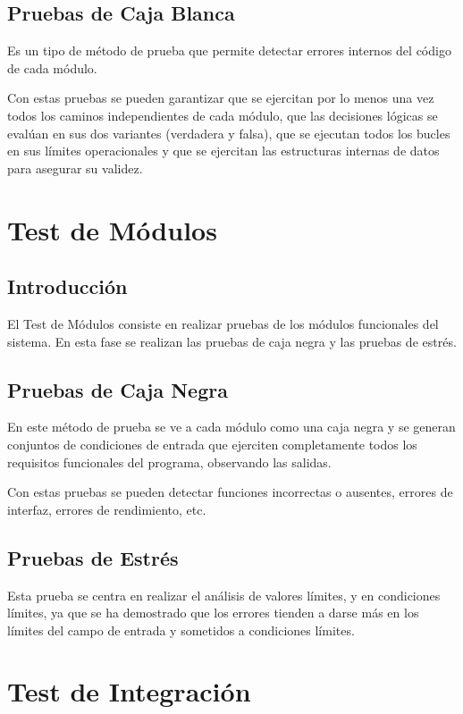 	\subsection{Pruebas de Caja Blanca}
		Es un tipo de método de prueba que permite detectar errores internos del código de cada módulo. 

		Con estas pruebas se pueden garantizar que se ejercitan por lo menos una vez todos los caminos independientes de cada módulo, que las decisiones lógicas se evalúan en sus dos variantes (verdadera y falsa), que se ejecutan todos los bucles en sus límites operacionales y que se ejercitan las estructuras internas de datos para asegurar su validez.

\section{Test de Módulos}

	\subsection{Introducción}
		El Test de Módulos consiste en realizar pruebas de los módulos funcionales del sistema. En esta fase se realizan las pruebas de caja negra y las pruebas de estrés. 

	\subsection{Pruebas de Caja Negra}

		En este método de prueba se ve a cada módulo como una caja negra y se generan conjuntos de condiciones de entrada que ejerciten completamente todos los requisitos funcionales del programa, observando las salidas.

		Con estas pruebas se pueden detectar funciones incorrectas o ausentes, errores de interfaz, errores de rendimiento, etc.
			
	\subsection{Pruebas de Estrés}

		Esta prueba se centra en realizar el análisis de valores límites, y en condiciones límites, ya que se ha demostrado que los errores tienden a darse más en los límites del campo de entrada y sometidos a condiciones límites.

\section{Test de Integración}

